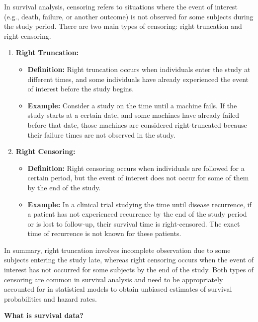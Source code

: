 \documentclass[
]{book}
\providecommand{\tightlist}{%
  \setlength{\itemsep}{0pt}\setlength{\parskip}{0pt}}
\begin{document}
In survival analysis, censoring refers to situations where the event of interest (e.g., death, failure, or another outcome) is not observed for some subjects during the study period. There are two main types of censoring: right truncation and right censoring.

\begin{enumerate}
\def\labelenumi{\arabic{enumi}.}
\tightlist
\item
  \textbf{Right Truncation:}

  \begin{itemize}
  \tightlist
  \item
    \textbf{Definition:} Right truncation occurs when individuals enter the study at different times, and some individuals have already experienced the event of interest before the study begins.
  \item
    \textbf{Example:} Consider a study on the time until a machine fails. If the study starts at a certain date, and some machines have already failed before that date, those machines are considered right-truncated because their failure times are not observed in the study.
  \end{itemize}
\item
  \textbf{Right Censoring:}

  \begin{itemize}
  \tightlist
  \item
    \textbf{Definition:} Right censoring occurs when individuals are followed for a certain period, but the event of interest does not occur for some of them by the end of the study.
  \item
    \textbf{Example:} In a clinical trial studying the time until disease recurrence, if a patient has not experienced recurrence by the end of the study period or is lost to follow-up, their survival time is right-censored. The exact time of recurrence is not known for these patients.
  \end{itemize}
\end{enumerate}

In summary, right truncation involves incomplete observation due to some subjects entering the study late, whereas right censoring occurs when the event of interest has not occurred for some subjects by the end of the study. Both types of censoring are common in survival analysis and need to be appropriately accounted for in statistical models to obtain unbiased estimates of survival probabilities and hazard rates.

\textbf{What is survival data?}
\end{document}
